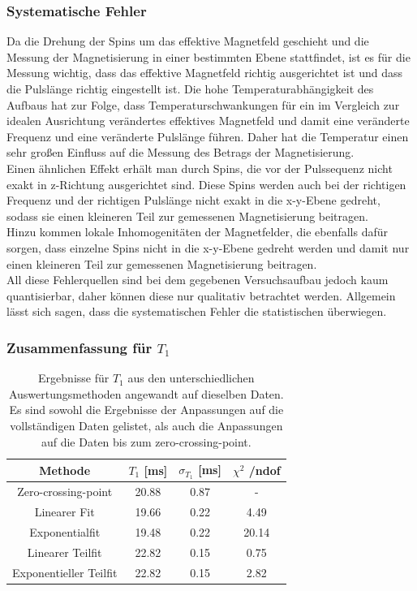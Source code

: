 \documentclass[12pt,a4paper]{article}
\begin{document}
\subsubsection{Systematische Fehler} 
Da die Drehung der Spins um das effektive Magnetfeld geschieht und die Messung der Magnetisierung in einer bestimmten Ebene stattfindet, ist es für die Messung wichtig, dass das effektive Magnetfeld richtig ausgerichtet ist und dass die Pulslänge richtig eingestellt ist. Die hohe Temperaturabhängigkeit des Aufbaus hat zur Folge, dass Temperaturschwankungen für ein im Vergleich zur idealen Ausrichtung verändertes effektives Magnetfeld und damit eine veränderte Frequenz und eine veränderte Pulslänge führen. Daher hat die Temperatur einen sehr großen Einfluss auf die Messung des Betrags der Magnetisierung. \\
Einen ähnlichen Effekt erhält man durch Spins, die vor der Pulssequenz nicht exakt in z-Richtung ausgerichtet sind. Diese Spins werden auch bei der richtigen Frequenz und der richtigen Pulslänge nicht exakt in die x-y-Ebene gedreht, sodass sie einen kleineren Teil zur gemessenen Magnetisierung beitragen. \\
Hinzu kommen lokale Inhomogenitäten der Magnetfelder, die ebenfalls dafür sorgen, dass einzelne Spins nicht in die x-y-Ebene gedreht werden und damit nur einen kleineren Teil zur gemessenen Magnetisierung beitragen.\\
All diese Fehlerquellen sind bei dem gegebenen Versuchsaufbau jedoch kaum quantisierbar, daher können diese nur qualitativ betrachtet werden. Allgemein lässt sich sagen, dass die systematischen Fehler die statistischen überwiegen.

\subsubsection{Zusammenfassung für $T_1$}

\begin{table}
\centering
\begin{tabular}{|c|c|c|c|}
\hline 
Methode & $T_1$ [ms] & $\sigma _{T_1}$ [ms] & $\chi ^2$ /ndof \\ 
\hline 
Zero-crossing-point & 20.88 & 0.87 & - \\ 
\hline 
Linearer Fit & 19.66 & 0.22 & 4.49 \\ 
\hline 
Exponentialfit & 19.48 & 0.22 & 20.14 \\ 
\hline
\hline
Linearer Teilfit &  22.82 & 0.15 & 0.75 \\
\hline
Exponentieller Teilfit &  22.82 & 0.15 & 2.82 \\
\hline
\end{tabular} 
\caption{Ergebnisse für $T_1$ aus den unterschiedlichen Auswertungsmethoden angewandt auf dieselben Daten. Es sind sowohl die Ergebnisse der Anpassungen auf die vollständigen Daten gelistet, als auch die Anpassungen auf die Daten bis zum zero-crossing-point.}
\label{tab:T1_Ergebnisse}
\end{table}
\end{document}
